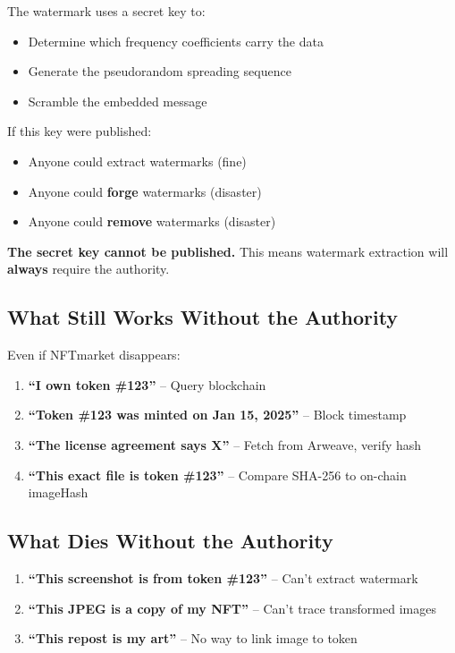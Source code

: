 \documentclass[11pt,a4paper]{article}
\begin{document}
The watermark uses a secret key to:
\begin{itemize}
    \item Determine which frequency coefficients carry the data
    \item Generate the pseudorandom spreading sequence
    \item Scramble the embedded message
\end{itemize}

If this key were published:
\begin{itemize}
    \item Anyone could extract watermarks (fine)
    \item Anyone could \textbf{forge} watermarks (disaster)
    \item Anyone could \textbf{remove} watermarks (disaster)
\end{itemize}

\textbf{The secret key cannot be published.} This means watermark extraction will \textbf{always} require the authority.

\subsection{What Still Works Without the Authority}

Even if NFTmarket disappears:

\begin{enumerate}
    \item \textbf{``I own token \#123''} -- Query blockchain
    \item \textbf{``Token \#123 was minted on Jan 15, 2025''} -- Block timestamp
    \item \textbf{``The license agreement says X''} -- Fetch from Arweave, verify hash
    \item \textbf{``This exact file is token \#123''} -- Compare SHA-256 to on-chain imageHash
\end{enumerate}

\subsection{What Dies Without the Authority}

\begin{enumerate}
    \item \textbf{``This screenshot is from token \#123''} -- Can't extract watermark
    \item \textbf{``This JPEG is a copy of my NFT''} -- Can't trace transformed images
    \item \textbf{``This repost is my art''} -- No way to link image to token
\end{enumerate}
\end{document}
